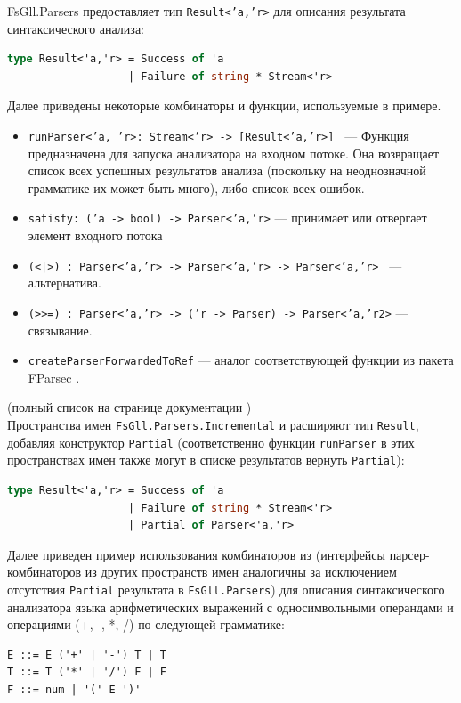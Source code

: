 \documentclass[14pt]{matmex-diploma}
\begin{document}
FsGll.Parsers предоставляет тип {\tt Result<'a,'r>} для описания результата синтаксического анализа:
\begin{lstlisting}[language=FSharp]
type Result<'a,'r> = Success of 'a
    	           | Failure of string * Stream<'r>
\end{lstlisting}

Далее приведены некоторые комбинаторы и функции, используемые в примере.
\begin{itemize}
    \item {\tt runParser<'a, 'r>: Stream<'r> -> [Result<'a,'r>] } --- Функция  предназначена для запуска анализатора на входном потоке. Она возвращает список всех успешных результатов анализа (поскольку на неоднозначной грамматике их может быть много), либо список всех ошибок.
    \item {\tt satisfy: ('a -> bool) -> Parser<'a,'r>} --- принимает или отвергает элемент входного потока 
    \item {\tt (<|>) : Parser<'a,'r> -> Parser<'a,'r> -> Parser<'a,'r> } --- альтернатива.
    \item {\tt (>}{\tt >=) : Parser<'a,'r> -> ('r -> Parser) -> Parser<'a,'r2>} --- связывание.
    \item {\tt createParserForwardedToRef} --- аналог соответствующей функции из пакета FParsec
        \cite{fparsec:createpforwtoref}.
\end{itemize}
(полный список на странице документации \cite{fsglldoc})\\

Пространства имен {\tt FsGll.Parsers.Incremental} и  
расширяют тип {\tt Result}, добавляя конструктор {\tt Partial} 
(соответственно функции {\tt runParser} в этих пространствах имен также могут 
в списке результатов вернуть {\tt Partial}):

\begin{lstlisting}[language=FSharp]
type Result<'a,'r> = Success of 'a
    	           | Failure of string * Stream<'r>
                   | Partial of Parser<'a,'r>
\end{lstlisting}

Далее приведен пример использования комбинаторов из  
(интерфейсы парсер-комбинаторов из других пространств имен аналогичны за исключением
отсутствия {\tt Partial} результата в {\tt FsGll.Parsers}) для описания синтаксического анализатора языка арифметических выражений с односимвольными операндами и операциями (+, -, *, /) по следующей грамматике:
\begin{lstlisting}
E ::= E ('+' | '-') T | T
T ::= T ('*' | '/') F | F
F ::= num | '(' E ')' 
\end{lstlisting}
\end{document}
